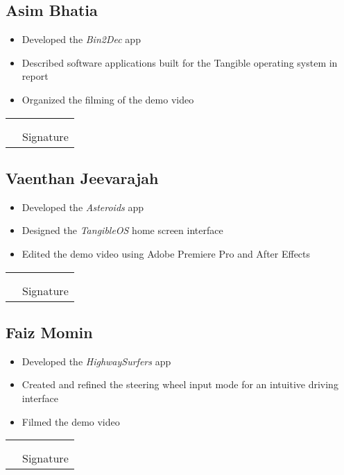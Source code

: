 \documentclass{article}
\begin{document}
\subsection{Asim Bhatia}
\begin{itemize}
    \item Developed the \textit{Bin2Dec} app
    \item Described software applications built for the Tangible operating system in report
    \item Organized the filming of the demo video
\end{itemize}
\begin{tabular}{@{}p{0in}p{4in}@{}}
\\
\\
& \hrulefill \\
& Signature \\
\end{tabular}
\subsection{Vaenthan Jeevarajah}
\begin{itemize}
    \item Developed the \textit{Asteroids} app
    \item Designed the \textit{TangibleOS} home screen interface
    \item Edited the demo video using Adobe Premiere Pro and After Effects
\end{itemize}
\begin{tabular}{@{}p{0in}p{4in}@{}}
\\
\\
& \hrulefill \\
& Signature \\
\end{tabular}
\subsection{Faiz Momin}
\begin{itemize}
    \item Developed the \textit{HighwaySurfers} app
    \item Created and refined the steering wheel input mode for an intuitive driving interface
    \item Filmed the demo video
\end{itemize}
\begin{tabular}{@{}p{0in}p{4in}@{}}
\\
\\
& \hrulefill \\
& Signature \\
\end{tabular}
\end{document}
